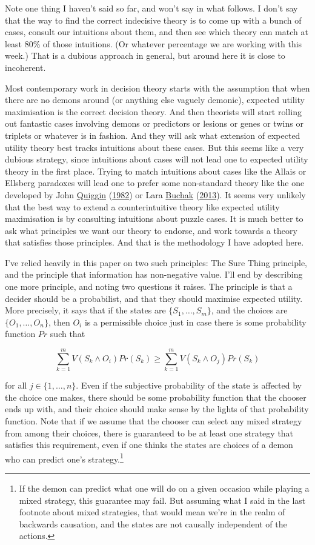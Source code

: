 \documentclass[
  12pt,
]{article}
\begin{document}
Note one thing I haven't said so far, and won't say in what follows. I
don't say that the way to find the correct indecisive theory is to come
up with a bunch of cases, consult our intuitions about them, and then
see which theory can match at least 80\% of those intuitions. (Or
whatever percentage we are working with this week.) That is a dubious
approach in general, but around here it is close to incoherent.

Most contemporary work in decision theory starts with the assumption
that when there are no demons around (or anything else vaguely demonic),
expected utility maximisation is the correct decision theory. And then
theorists will start rolling out fantastic cases involving demons or
predictors or lesions or genes or twins or triplets or whatever is in
fashion. And they will ask what extension of expected utility theory
best tracks intuitions about these cases. But this seems like a very
dubious strategy, since intuitions about cases will not lead one to
expected utility theory in the first place. Trying to match intuitions
about cases like the Allais or Ellsberg paradoxes will lead one to
prefer some non-standard theory like the one developed by John
\protect\hyperlink{ref-Quiggin1982}{Quiggin}
(\protect\hyperlink{ref-Quiggin1982}{1982}) or Lara
\protect\hyperlink{ref-BuchakRisk}{Buchak}
(\protect\hyperlink{ref-BuchakRisk}{2013}). It seems very unlikely that
the best way to extend a counterintuitive theory like expected utility
maximisation is by consulting intuitions about puzzle cases. It is much
better to ask what principles we want our theory to endorse, and work
towards a theory that satisfies those principles. And that is the
methodology I have adopted here.

I've relied heavily in this paper on two such principles: The Sure Thing
principle, and the principle that information has non-negative value.
I'll end by describing one more principle, and noting two questions it
raises. The principle is that a decider should be a probabilist, and
that they should maximise expected utility. More precisely, it says that
if the states are \(\{S_1, \dots, S_m\}\), and the choices are
\(\{O_1, \dots, O_n\}\), then \(O_i\) is a permissible choice just in
case there is some probability function \(Pr\) such that

\[
\sum_{k = 1}^m V(S_k \wedge O_i)Pr(S_k) \geq \sum_{k = 1}^m V(S_k \wedge O_j)Pr(S_k)
\]

for all \(j \in \{1, \dots, n\}\). Even if the subjective probability of
the state is affected by the choice one makes, there should be some
probability function that the chooser ends up with, and their choice
should make sense by the lights of that probability function. Note that
if we assume that the chooser can select any mixed strategy from among
their choices, there is guaranteed to be at least one strategy that
satisfies this requirement, even if one thinks the states are choices of
a demon who can predict one's strategy.\footnote{If the demon can
  predict what one will do on a given occasion while playing a mixed
  strategy, this guarantee may fail. But assuming what I said in the
  last footnote about mixed strategies, that would mean we're in the
  realm of backwards causation, and the states are not causally
  independent of the actions.}
\end{document}

